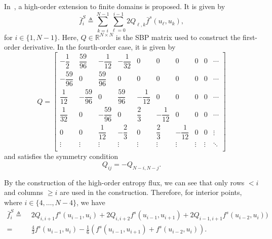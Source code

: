 \documentclass{scrartcl}
\begin{document}
In~\cite{Fisher2013}, a high-order extension to finite domains is proposed.
It is given by
\[
\bar{f}^{S}_i \triangleq \sum_{k = i}^{N - 1} \sum_{\ell = 0}^{i - 1}
2 Q_{\ell, k} \bar{f}^s(u_\ell, u_k),
\]
for $i \in \{1, N - 1\}$. Here, $Q \in \mathbb{R}^{N \times N}$ is the SBP
matrix used to construct the first-order derivative. In the fourth-order case,
it is given by~\cite[Equation A.2]{Fisher2013}
\[
Q =
\begin{bmatrix}
    -\dfrac{1}{2} & \dfrac{59}{96} & -\dfrac{1}{12} & -\dfrac{1}{32}
    & 0 & 0 & 0 & 0 & 0 & \cdots \\[1em]
    -\dfrac{59}{96} & 0 & \dfrac{59}{96}
    & 0 & 0 & 0 & 0 & 0 & 0 & \cdots \\[1em]
    \dfrac{1}{12} & -\dfrac{59}{96} & 0 & \dfrac{59}{96} & -\dfrac{1}{12}
    & 0 & 0 & 0 & 0 & \cdots \\[1em]
    \dfrac{1}{32} & 0 & -\dfrac{59}{96} & 0 & \dfrac{2}{3} & -\dfrac{1}{12}
    & 0 & 0 & 0 & \cdots \\[1em]
    0 & 0 & \dfrac{1}{12} & -\dfrac{2}{3} & 0 & \dfrac{2}{3} & -\dfrac{1}{12}
    & 0 & 0 & \vdots \\
    \vdots & \vdots & \vdots & \vdots & \vdots & \vdots & \vdots & \vdots & \vdots
    & \ddots \\[1em]
\end{bmatrix}
\]
and satisfies the symmetry condition
\[
Q_{ij} = -Q_{N - i, N - j}.
\]

By the construction of the high-order entropy flux, we can see that only
rows $< i$ and columns $\ge i$ are used in the construction. Therefore, for
interior points, where $i \in \{4, \dots, N - 4\}$, we have
\[
\begin{aligned}
\bar{f}^S_i \triangleq\,\, &
2 Q_{i, i + 1} f^s(u_{i - 1}, u_i)
+ 2 Q_{i, i + 2} f^s(u_{i - 1}, u_{i + 1})
+ 2 Q_{i - 1, i + 1} f^s(u_{i - 2}, u_i)) \\
=\,\, &
\frac{4}{3} f^s(u_{i - 1}, u_i)
- \frac{1}{6} (f^s(u_{i - 1}, u_{i + 1}) + f^s(u_{i - 2}, u_i)).
\end{aligned}
\]
\end{document}
